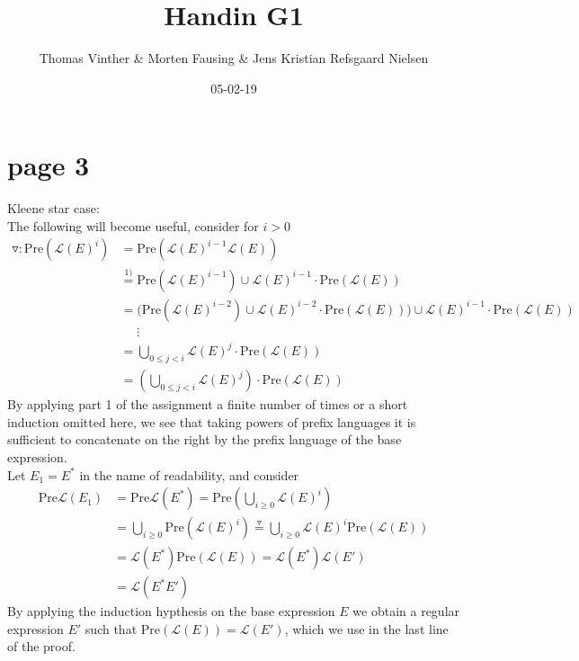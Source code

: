 \documentclass{article}
\theoremstyle{remark}
\numberwithin{equation}{section}
\begin{document}
	\author{Thomas Vinther \& Morten Fausing \& Jens Kristian Refsgaard Nielsen}
	\title{Handin G1}
	\date{05-02-19}
	\maketitle
\section{page 3}
Kleene star case:\\ The following will become useful, consider for $i>0$
\begin{align*}
	\triangledown: \text{Pre}(\mathcal{L}(E)^i) &= \text{Pre}(\mathcal{L}(E)^{i-1}\mathcal{L}(E))\\
	&\stackrel{1)}{=} \text{Pre}(\mathcal{L}(E)^{i-1})\cup\mathcal{L}(E)^{i-1}\cdot\text{Pre}(\mathcal{L}(E))\\
	&=\bigg(\text{Pre}(\mathcal{L}(E)^{i-2})\cup\mathcal{L}(E)^{i-2}\cdot\text{Pre}(\mathcal{L}(E))\bigg)\cup\mathcal{L}(E)^{i-1}\cdot\text{Pre}(\mathcal{L}(E))\\
	&\text{ }\text{ }\vdots\\
	&= \bigcup_{0\leq j < i} \mathcal{L}(E)^j \cdot \text{Pre}(\mathcal{L}(E))\\
	&= \left(\bigcup_{0\leq j < i} \mathcal{L}(E)^j\right) \cdot \text{Pre}(\mathcal{L}(E)) 
\end{align*}
By applying part 1 of the assignment a finite number of times or a short induction omitted here, we see that taking powers of prefix languages it is sufficient to concatenate on the right by the prefix language of the base expression.\\
Let $E_1 = E^*$ in the name of readability, and consider\\
\begin{align*}
	\text{Pre}\mathcal{L}(E_1)&= \text{Pre}\mathcal{L}(E^*) = \text{Pre}\left( \bigcup_{i\geq 0} \mathcal{L}(E)^i \right)\\
	&= \bigcup_{i\geq 0} \text{Pre}(\mathcal{L}(E)^i) \stackrel{\triangledown}{=} \bigcup_{i\geq 0} \mathcal{L}(E)^i \text{Pre}(\mathcal{L}(E))\\
	&= \mathcal{L}(E^*)\text{Pre}(\mathcal{L}(E)) = \mathcal{L}(E^*)\mathcal{L}(E')\\
	&=\mathcal{L}(E^*E')
\end{align*}
By applying the induction hypthesis on the base expression $E$ we obtain a regular expression $E'$ such that Pre$(\mathcal{L}(E))=\mathcal{L}(E')$, which we use in the last line of the proof.
\end{document}
